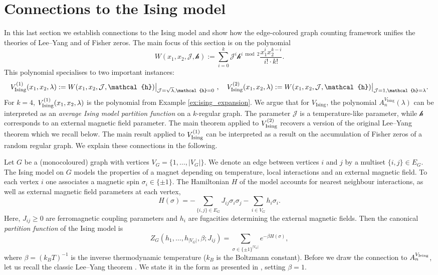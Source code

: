 \documentclass[11pt, a4paper]{article}
\numberwithin{theorem}{section}
\theoremstyle{remark}
\newcommand{\J}{\mathcal{J}}
\newcommand{\h}{\mathcal{h}}
\newcommand\restr[2]{{%
  \left.\kern-\nulldelimiterspace %
  #1 %
  \littletaller %
  \right|_{#2} %
  }}
\newcommand{\littletaller}{\mathchoice{\vphantom{\big|}}{}{}{}}
\theoremstyle{theorem}
\begin{document}
\section{Connections to the Ising model}
\label{sec:Ising}

In this last section we establish connections to the Ising model and show how the edge-coloured graph counting framework unifies the theories of Lee--Yang and of Fisher zeros.
The main focus of this section is on the polynomial 
\begin{equation}
  \label{eq:master_polynomial}
  W(x_1,x_2,\mathcal{J},\mathcal{h}) := \sum_{i = 0}^{k} \mathcal{J}^i \mathcal{h}^{i \bmod 2}\frac{x_1^{i}x_2^{k-i}}{i!\cdot k!}.
\end{equation}
This polynomial specialises to two important instances:
\[
  V_{\rm Ising}^{(1)}(x_1,x_2,\lambda) := \restr{W(x_1,x_2,\J,\h)}{\J = \sqrt{\lambda},\h=0} ~, \quad V_{\rm Ising}^{(2)}(x_1,x_2,\lambda) := \restr{W(x_1,x_2,\J,\h)}{\J = 1,\h=\lambda}.
\]
For $k=4$, $V_{\rm Ising}^{(1)}(x_1,x_2,\lambda)$ is the polynomial from Example \ref{ex:ising_expansion}. We argue that for $V_{\text{Ising}}$, the polynomial $A_n^{V_{\text{Ising}}}(\lambda)$ can be interpreted as an \emph{average Ising model partition function} on a $k$-regular graph. The parameter $\J$ is a temperature-like parameter, while $\h$ corresponds to an external magnetic field parameter. The main theorem applied to $V_{\rm Ising}^{(2)}$ recovers a version of the original Lee--Yang theorem which we recall below. The main result applied to $V_{\rm Ising}^{(1)}$ can be interpreted as a result on the accumulation of Fisher zeros of a random regular graph. We explain these connections in the following. \par

Let $G$ be a (monocoloured) graph with vertices $V_G = \{ 1,\dots,|V_G| \}$. We denote an edge between vertices $i$ and $j$ by a multiset $\{i,j\} \in E_G$. The Ising model \cite{lenz1920Ising} on $G$ models the properties of a magnet depending on temperature, local interactions and an external magnetic field. To each vertex $i$ one associates a magnetic spin $\sigma_i \in \{\pm 1\}$. The Hamiltonian $H$ of the model accounts for nearest neighbour interactions, as well as external magnetic field parameters at each vertex,
\[
  H(\sigma) = -\sum_{\{i,j\}\in E_G} J_{ij}\sigma_i\sigma_j - \sum_{i \in V_G} h_i \sigma_i.
\]
Here, $J_{ij} \geq 0$ are ferromagnetic coupling parameters and $h_i$ are fugacities determining the external magnetic fields. Then the canonical \emph{partition function} of the Ising model is 
\[
  Z_G(h_1,\dots, h_{|V_G|},\beta; J_{ij}) = \sum_{\sigma \in \{\pm 1\}^{|V_G|}} e^{-\beta H(\sigma)},
\]
where $\beta = (k_B T)^{-1}$ is the inverse thermodynamic temperature ($k_B$ is the Boltzmann constant). Before we draw the connection to $A_n^{V_{\rm Ising}}$, let us recall the classic Lee--Yang theorem \cite{leeYang}. We state it in the form as presented in \cite{borcea2009lee}, setting $\beta = 1$.
\end{document}
